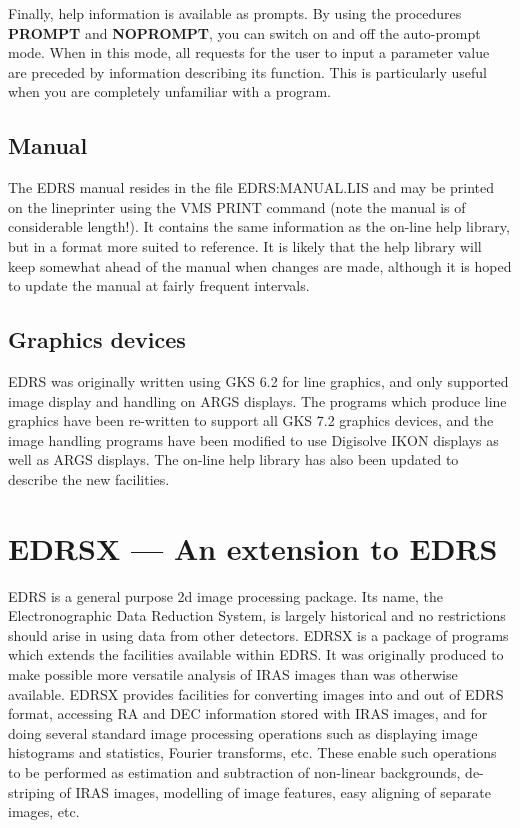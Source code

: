 Finally, help information is available as prompts.
By using the procedures {\bf PROMPT} and {\bf NOPROMPT}, you can switch on and
off the auto-prompt mode.
When in this mode, all requests for the user to input a parameter value are
preceded by information describing its function.
This is particularly useful when you are completely unfamiliar with a program.
\subsection {Manual}
The EDRS manual resides in the file EDRS:MANUAL.LIS and may be printed on the
lineprinter using the VMS PRINT command (note the manual is of considerable
length!).
It contains the same information as the on-line help library, but in a format
more suited to reference.
It is likely that the help library will keep somewhat ahead of the manual when
changes are made, although it is hoped to update the manual at fairly frequent
intervals.
\subsection {Graphics devices}
EDRS was originally written using GKS 6.2 for line graphics, and only supported
image display and handling on ARGS displays.
The programs which produce line graphics have been re-written to support all
GKS 7.2 graphics devices, and the image handling programs have been modified to
use Digisolve IKON displays as well as ARGS displays.
The on-line help library has also been updated to describe the new facilities.

\section {EDRSX --- An extension to EDRS}

EDRS is a general purpose 2d image processing package.
Its name, the Electronographic Data  Reduction System, is largely historical and
no restrictions should arise in using data from other detectors.
EDRSX is a package of programs which extends the facilities available within
EDRS.
It was originally produced to make possible more versatile analysis of IRAS
images than was otherwise available.
EDRSX provides facilities for converting images into and out of EDRS format,
accessing RA and DEC information stored with IRAS images, and for doing several
standard image processing operations such as displaying image histograms and
statistics, Fourier transforms, etc.
These enable such operations to be performed as estimation and subtraction of
non-linear backgrounds, de-striping of IRAS images, modelling of image features,
easy aligning of separate images, etc.
